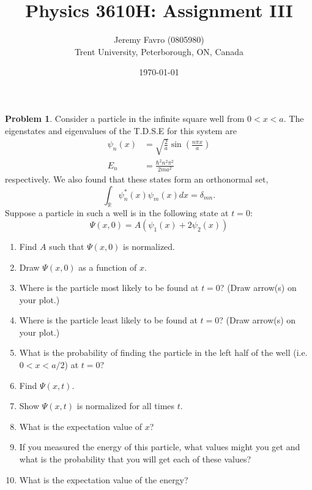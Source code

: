 \documentclass[10pt]{article}
\title{Physics 3610H: Assignment III}
\author{Jeremy Favro (0805980) \\ Trent University, Peterborough, ON, Canada}
\date{\today}
\theoremstyle{definition}
\newtheorem{problem}{Problem}
\begin{document}
\maketitle

\begin{problem}
Consider a particle in the infinite square well from $0<x<a$. The eigenstates and eigenvalues of the
T.D.S.E for this system are
\begin{align*}
  \psi_n(x) & =\sqrt{\frac{2}{a}}\sin\left(\frac{n\pi x}{a}\right) \\
  E_n       & =\frac{\hbar^2n^2\pi^2}{2ma^2}
\end{align*}
respectively. We also found that these states form an orthonormal set,
$$
  \int_{\mathbb{R}}\psi^*_n(x)\psi_m(x)dx=\delta_{mn}.
$$
Suppose a particle in such a well is in the following state at $t=0$:
$$
  \Psi(x,0)=A(\psi_1(x)+2\psi_2(x))
$$
\begin{enumerate}[label=(\alph*)]
  \item Find $A$ such that $\Psi(x,0)$ is normalized.
  \item Draw $\Psi(x,0)$ as a function of $x$.
  \item Where is the particle most likely to be found at $t = 0$? (Draw arrow(s) on your plot.)
  \item Where is the particle least likely to be found at $t = 0$? (Draw arrow(s) on your plot.)
  \item What is the probability of finding the particle in the left half of the well (i.e. $0 < x < a/2$)
        at $t = 0$?
  \item Find $\Psi(x,t)$.
  \item Show $\Psi(x,t)$ is normalized for all times $t$.
  \item What is the expectation value of $x$?
  \item If you measured the energy of this particle, what values might you get and what is the
        probability that you will get each of these values?
  \item What is the expectation value of the energy?
\end{enumerate}
\end{problem}
\newpage
\end{document}
